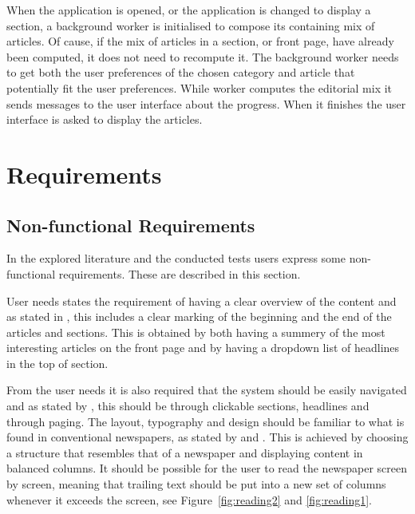 
When the application is opened, or the application is changed to display a section, a background worker is initialised to compose its containing mix of articles. Of cause, if the mix of articles in a section, or front page, have already been computed, it does not need to recompute it. The background worker needs to get both the user preferences of the chosen category and article that potentially fit the user preferences. While worker computes the editorial mix it sends messages to the user interface about the progress. When it finishes the user interface is asked to display the articles.

\section{Requirements}
\subsection{Non-functional Requirements}
In the explored literature and the conducted tests users express some non-functional requirements. These are described in this section.

User needs states the requirement of having a clear overview of the content and as stated in \cite{FULLTEXT01.pdf}, this includes a clear marking of the beginning and the end of the articles and sections. This is obtained by both having a summery of the most interesting articles on the front page and by having a dropdown list of headlines in the top of section.

From the user needs it is also required that the system should be easily navigated and as stated by \cite{kristin_fredrik.pdf}, this should be through clickable sections, headlines and through paging. The layout, typography and design should be familiar to what is found in conventional newspapers, as stated by \cite{FULLTEXT01.pdf} and \cite{hcii2005_1004.pdf}. This is achieved by choosing a structure that resembles that of a newspaper and displaying content in balanced columns. It should be possible for the user to read the newspaper screen by screen, meaning that trailing text should be put into a new set of columns whenever it exceeds the screen, see Figure~\ref{fig:reading2} and \ref{fig:reading1}.

